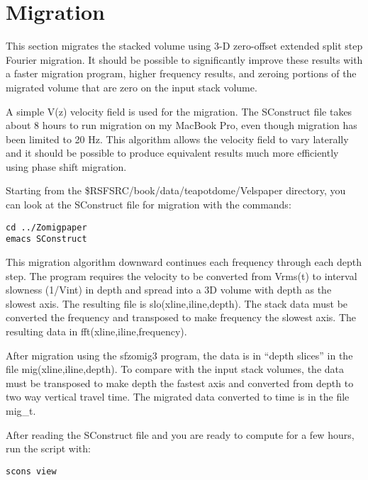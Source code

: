

\section{Migration}

This section migrates the stacked volume using 3-D zero-offset extended split step Fourier migration.  It should be possible to significantly improve these results with a faster migration program, higher frequency results, and zeroing portions of the migrated volume that are zero on the input stack volume.

A simple V(z) velocity field is used for the migration.  The SConstruct file takes about 8 hours to run migration on my MacBook Pro, even though migration has been limited to 20 Hz.   This algorithm allows the velocity field to vary laterally and it should be possible to produce equivalent results much more efficiently using phase shift migration.
 
Starting from the \$RSFSRC/book/data/teapotdome/Velspaper directory, you can look at the SConstruct file for migration with the commands:
\begin{verbatim}  
cd ../Zomigpaper
emacs SConstruct
\end{verbatim}  

This migration algorithm downward continues each frequency through each depth step.  The program requires the velocity to be converted from Vrms(t) to interval slowness (1/Vint) in depth and spread into a 3D volume with depth as the slowest axis.  The resulting file is slo(xline,iline,depth).  The stack data must be converted the frequency and transposed to make frequency the slowest axis.  The resulting data in fft(xline,iline,frequency).  
 
After migration using the sfzomig3 program, the data is in “depth slices” in the file mig(xline,iline,depth).  To compare with the input stack volumes, the data must be transposed to make depth the fastest axis and converted from depth to two way vertical travel time.  The migrated data converted to time is in the file mig\_t.

After reading the SConstruct file and you are ready to compute for a few hours, run the script with:
\begin{verbatim}  
scons view
\end{verbatim}  

